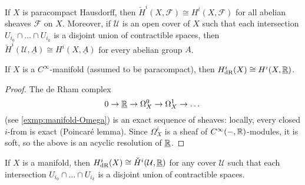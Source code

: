 \begin{prop}\label{prop:comparison-sheaf-cohomology-Čech-cohomology}
If \(X\) is paracompact Hausdorff, then \(\check{H}^i(X,\mathcal F)\cong H^i(X,\mathcal F)\) for all abelian sheaves \(\mathcal F\) on \(X\).
Moreover, if \(\mathcal U\) is an open cover of \(X\) such that each intersection \(U_{i_0}\cap\dots\cap U_{i_k}\) is a disjoint union of contractible spaces, then \(\check{H}^i(\mathcal U,\underline{A})\cong H^i(X,\underline{A})\) for every abelian group \(A\).
\end{prop}

\begin{prop}\label{prop:comparison-de-Rham-cohomology-sheaf-cohomology}
If \(X\) is a \(C^\infty\)-manifold (assumed to be paracompact), then \(H^i_{\smash{\textup{dR}}}(X)\cong H^i(X,\underline{\mathbb{R}})\).
\end{prop}
\begin{proof}
The de Rham complex
\[ 0\to\underline{\mathbb{R}}\to \Omega^0_X \to \Omega^1_X \to \dots \]
(see \cref{exmp:manifold-Omega}) is an exact sequence of sheaves: locally, every closed \(i\)-from is exact (Poincaré lemma).
Since \(\Omega^i_X\) is a sheaf of \(C^\infty(-,\mathbb{R})\)-modules, it is soft, so the above is an acyclic resolution of \(\underline{\mathbb{R}}\).
\end{proof}

\begin{prop}\label{prop:comparison-de-Rham-cohomology-Čech-chomology}
If \(X\) is a manifold, then \(H^i_{\smash{\textup{dR}}}(X)\cong\check{H}^i(\mathcal U,\underline{\mathbb{R}})\) for any cover \(\mathcal U\) such that each intersection \(U_{i_0}\cap \dots\cap U_{i_k}\) is a disjoint union of contractible spaces.
\end{prop}


